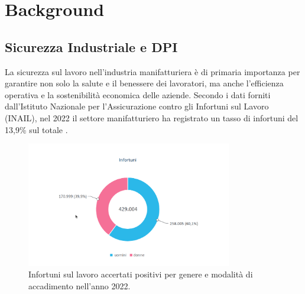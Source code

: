 \chapter{Background}

\section{Sicurezza Industriale e DPI}

La sicurezza sul lavoro nell'industria manifatturiera è di primaria importanza per garantire non solo la salute e il benessere dei lavoratori, ma anche l'efficienza operativa e la sostenibilità economica delle aziende. Secondo i dati forniti dall'Istituto Nazionale per l'Assicurazione contro gli Infortuni sul Lavoro (INAIL), nel 2022 il settore manifatturiero ha registrato un tasso di infortuni del 13,9\% sul totale \cite{inail2023}.

\begin{figure}[htbp]
    \centering
    \includegraphics[width=0.8\textwidth]{figures/totaleinfortuni.png}
    \caption{Infortuni sul lavoro accertati positivi per genere
e modalità di accadimento nell'anno 2022.}
    \label{fig:infortot}
\end{figure}

